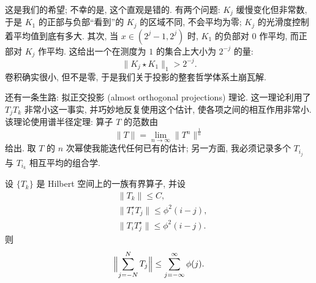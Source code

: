 这是我们的希望; 不幸的是, 这个直观是错的. 有两个问题: $K_j$ 缓慢变化但非常数, 于是 $K_1$ 的正部与负部``看到''的 $K_j$ 的区域不同, 不会平均为零; $K_j$ 的光滑度控制着平均值到底有多大. 其次, 当 $x\in(2^j-1,2^j)$ 时, $K_1$ 的负部对 $0$ 作平均, 而正部对 $K_j$ 作平均. 这给出一个在测度为 $1$ 的集合上大小为 $2^{-j}$ 的量:
\[
\|K_{j}\star K_{1}\|_{1}>2^{-j}.
\]
卷积确实很小, 但不是零, 于是我们关于投影的整套哲学体系土崩瓦解.

还有一条生路: 拟正交投影 (almost orthogonal projections) 理论. 这一理论利用了 $T_jT_k$ 非常小这一事实, 并巧妙地反复使用这个估计, 使各项之间的相互作用非常小. 该理论使用谱半径定理: 算子 $T$ 的范数由
\[
\|T\|=\lim_{n\to\infty}\|T^{n}\|^{\frac{1}{n}}
\]
给出. 取 $T$ 的 $n$ 次幂使我能迭代任何已有的估计; 另一方面, 我必须记录多个 $T_{i_j}$ 与 $T_{i_k}$ 相互平均的组合学.

\begin{theorem}\label{thm:2.18}
设 $\{T_{k}\}$ 是 Hilbert 空间上的一族有界算子, 并设
\begin{align*}
&\left\|T_{k}\right\|\leq C, \\
&\|T_{i}^{\star}T_{j}\|\leq\phi^{2}(i-j), \\
&\|T_{i}T_{j}^{\star}\|\leq\phi^{2}(i-j).
\end{align*}
则
\[
\Bigl\|\sum_{j=-N}^{N}T_{j}\Bigr\|\leq\sum_{j=-\infty}^{\infty}\phi(j).
\]
\end{theorem}

